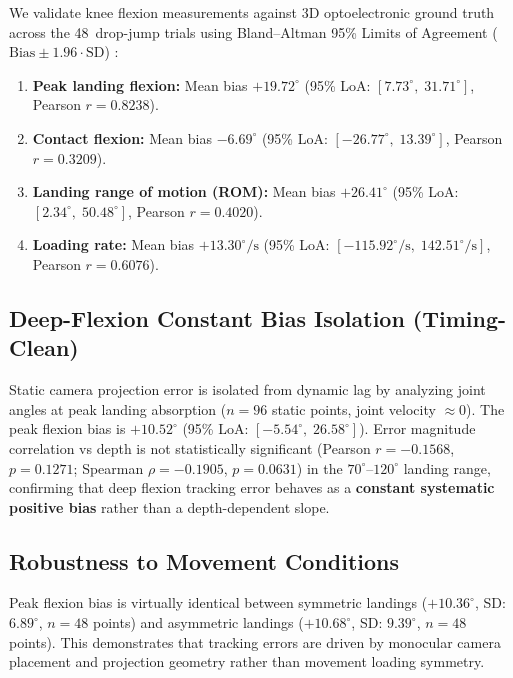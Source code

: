 We validate knee flexion measurements against 3D optoelectronic ground truth across the 48~drop-jump trials using Bland--Altman 95\% Limits of Agreement ($\text{Bias} \pm 1.96 \cdot \text{SD}$) \citep{Bland_Altman_1986}:
\begin{enumerate}
  \item \textbf{Peak landing flexion:} Mean bias $+19.72^\circ$ (95\% LoA: $[7.73^\circ,\; 31.71^\circ]$, Pearson $r = 0.8238$).
  \item \textbf{Contact flexion:} Mean bias $-6.69^\circ$ (95\% LoA: $[-26.77^\circ,\; 13.39^\circ]$, Pearson $r = 0.3209$).
  \item \textbf{Landing range of motion (ROM):} Mean bias $+26.41^\circ$ (95\% LoA: $[2.34^\circ,\; 50.48^\circ]$, Pearson $r = 0.4020$).
  \item \textbf{Loading rate:} Mean bias $+13.30^\circ/\text{s}$ (95\% LoA: $[-115.92^\circ/\text{s},\; 142.51^\circ/\text{s}]$, Pearson $r = 0.6076$).
\end{enumerate}

\subsection{Deep-Flexion Constant Bias Isolation (Timing-Clean)}
\label{sec:bias-isolation}

Static camera projection error is isolated from dynamic lag by analyzing joint angles at peak landing absorption ($n = 96$ static points, joint velocity $\approx 0$). The peak flexion bias is $+10.52^\circ$ (95\% LoA: $[-5.54^\circ,\; 26.58^\circ]$). Error magnitude correlation vs depth is not statistically significant (Pearson $r = -0.1568$, $p = 0.1271$; Spearman $\rho = -0.1905$, $p = 0.0631$) in the $70^\circ\text{--}120^\circ$ landing range, confirming that deep flexion tracking error behaves as a \textbf{constant systematic positive bias} rather than a depth-dependent slope.

\subsection{Robustness to Movement Conditions}
\label{sec:robustness}

Peak flexion bias is virtually identical between symmetric landings ($+10.36^\circ$, SD: $6.89^\circ$, $n=48$ points) and asymmetric landings ($+10.68^\circ$, SD: $9.39^\circ$, $n=48$ points). This demonstrates that tracking errors are driven by monocular camera placement and projection geometry rather than movement loading symmetry.

